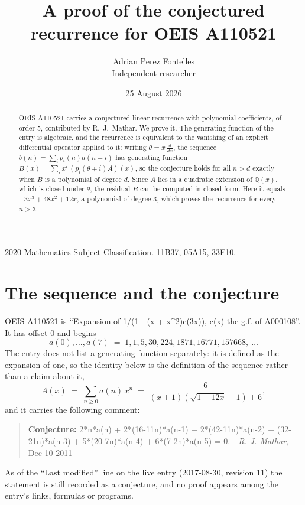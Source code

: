 \documentclass[11pt,a4paper]{article}
\title{A proof of the conjectured recurrence for OEIS A110521}
\author{Adrian Perez Fontelles\\ \small Independent researcher}
\date{25 August 2026}
\theoremstyle{plain}
\theoremstyle{definition}
\begin{document}
\maketitle

\begin{abstract}
OEIS A110521 carries a conjectured linear recurrence with polynomial coefficients, of
order 5, contributed by R.~J.~Mathar. We prove it. The generating function of the
entry is algebraic, and the recurrence is equivalent to the vanishing of an explicit
differential operator applied to it: writing $\theta=x\,\frac{d}{dx}$, the sequence
$b(n)=\sum_{i}p_{i}(n)a(n-i)$ has generating function
$B(x)=\sum_{i}x^{i}\,(p_{i}(\theta+i)A)(x)$, so the conjecture holds for all $n>d$ exactly
when $B$ is a polynomial of degree $d$. Since $A$ lies in a quadratic extension of
$\mathbb{Q}(x)$, which is closed under $\theta$, the residual $B$ can be computed in
closed form. Here it equals $- 3 x^{3} + 48 x^{2} + 12 x$, a polynomial of degree $3$, which proves
the recurrence for every $n>3$.
\end{abstract}

\noindent\small 2020 Mathematics Subject Classification. 11B37, 05A15, 33F10.\normalsize

\section{The sequence and the conjecture}

OEIS A110521 is ``Expansion of 1/(1 - (x + x\^{}2)c(3x)), c(x) the g.f. of A000108''. It has offset $0$ and begins
\[
a(0),\dots,a(7)\;=\;1, 1, 5, 30, 224, 1871, 16771, 157668,\ \dots
\]
The entry does not list a generating function separately: it is defined as the
expansion of one, so the identity below is the definition of the sequence rather than a
claim about it,
\begin{equation}\label{eq:gf}
A(x)\;=\;\sum_{n\ge 0} a(n)\,x^{n}\;=\;\frac{6}{\left(x + 1\right) \left(\sqrt{1 - 12 x} - 1\right) + 6} ,
\end{equation}
and it carries the following comment:
\begin{quote}\small
\textbf{Conjecture:} 2*n*a(n) + 2*(16-11n)*a(n-1) + 2*(42-11n)*a(n-2) + (32-21n)*a(n-3) + 5*(20-7n)*a(n-4) + 6*(7-2n)*a(n-5) = 0. - \emph{R. J. Mathar}, Dec 10 2011
\end{quote}
As of the ``Last modified'' line on the live entry (2017-08-30, revision 11) the
statement is still recorded as a conjecture, and no proof appears among the entry's links,
formulas or programs.
\end{document}
